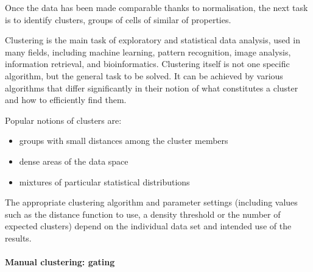 
Once the data has been made comparable thanks to normalisation, the next task is to identify clusters, groups of cells of similar of properties.


Clustering is the main task of exploratory and statistical data analysis, used in many fields, including machine learning, pattern recognition, image analysis, information retrieval, and bioinformatics.
Clustering itself is not one specific algorithm, but the general task to be solved.
It can be achieved by various algorithms that differ significantly in their notion of what constitutes a cluster and how to efficiently find them.

Popular notions of clusters are:
\begin{itemize}
  \item groups with small distances among the cluster members
  \item dense areas of the data space
  \item mixtures of particular statistical distributions
\end{itemize}

The appropriate clustering algorithm and parameter settings (including values such as the distance function to use, a density threshold or the number of expected clusters)
depend on the individual data set and intended use of the results.


\paragraph{Manual clustering: gating}

